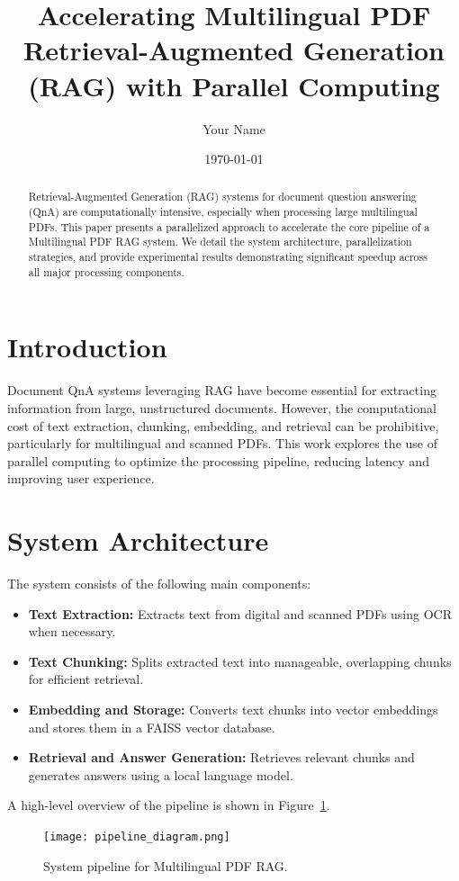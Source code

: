 \documentclass[11pt,a4paper]{article}
\title{Accelerating Multilingual PDF Retrieval-Augmented Generation (RAG) with Parallel Computing}
\author{Your Name}
\date{\today}
\begin{document}
\maketitle

\begin{abstract}
Retrieval-Augmented Generation (RAG) systems for document question answering (QnA) are computationally intensive, especially when processing large multilingual PDFs. This paper presents a parallelized approach to accelerate the core pipeline of a Multilingual PDF RAG system. We detail the system architecture, parallelization strategies, and provide experimental results demonstrating significant speedup across all major processing components.
\end{abstract}

\section{Introduction}
Document QnA systems leveraging RAG have become essential for extracting information from large, unstructured documents. However, the computational cost of text extraction, chunking, embedding, and retrieval can be prohibitive, particularly for multilingual and scanned PDFs. This work explores the use of parallel computing to optimize the processing pipeline, reducing latency and improving user experience.

\section{System Architecture}
The system consists of the following main components:
\begin{itemize}
    \item \textbf{Text Extraction:} Extracts text from digital and scanned PDFs using OCR when necessary.
    \item \textbf{Text Chunking:} Splits extracted text into manageable, overlapping chunks for efficient retrieval.
    \item \textbf{Embedding and Storage:} Converts text chunks into vector embeddings and stores them in a FAISS vector database.
    \item \textbf{Retrieval and Answer Generation:} Retrieves relevant chunks and generates answers using a local language model.
\end{itemize}
A high-level overview of the pipeline is shown in Figure~\ref{fig:pipeline}.

\begin{figure}[h]
    \centering
    \texttt{[image: pipeline\_diagram.png]}
    \caption{System pipeline for Multilingual PDF RAG.}
    \label{fig:pipeline}
\end{figure}
\end{document}
